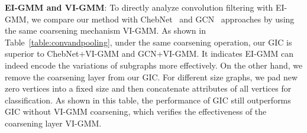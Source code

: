 \documentclass[letterpaper]{article} \usepackage{aaai19}  \usepackage{times}  \usepackage{helvet}  \usepackage{courier}  \usepackage{url}  \usepackage{graphicx}  \frenchspacing  \setlength{\pdfpagewidth}{8.5in}  \setlength{\pdfpageheight}{11in}
\begin{document}
\begin{table}[!t]
	\centering
	\caption{Comparisons on the layer number.}
	\label{table:layer}
	\begin{sc}	
	\end{sc}
\end{table}

\textbf{EI-GMM and VI-GMM}: To directly analyze convolution filtering with EI-GMM, we compare our method with ChebNet~\cite{defferrard2016convolutional} and GCN~\cite{kipf2016semi} approaches by using the same coarsening mechanism VI-GMM.  As shown in Table~\ref{table:convandpooling}, under the same coarsening operation, our GIC is superior to ChebNet+VI-GMM and GCN+VI-GMM. It indicates EI-GMM can indeed encode the variations of subgraphs more effectively. On the other hand, we remove the coarsening layer from our GIC. For different size graphs, we pad new zero vertices into a fixed size and then concatenate attributes of all vertices for classification. As shown in this table, the performance of GIC still outperforms GIC without VI-GMM coarsening, which verifies the effectiveness of the coarsening layer VI-GMM.
\end{document}
